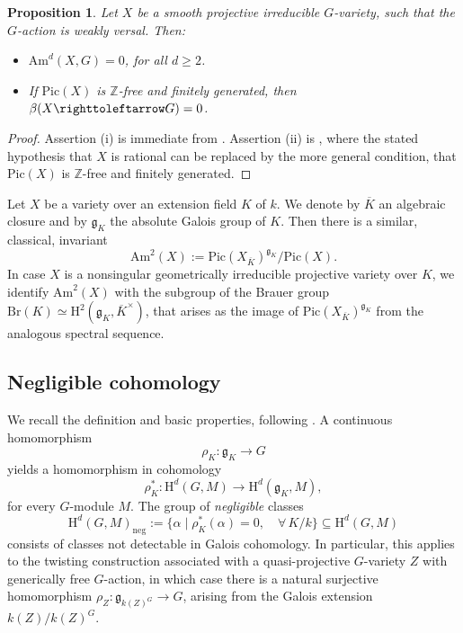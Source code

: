 \documentclass[12pt, reqno]{amsart}
\numberwithin{equation}{section}
\theoremstyle{plain}
\newtheorem{prop}{Proposition}[section]
\theoremstyle{definition}
\newcommand{\actsfromright}{\righttoleftarrow}
\def\bZ{{\mathbb Z}}
\def\rH{{\mathrm H}}
\def\Br{\mathrm{Br}}
\def\Pic{\mathrm{Pic}}
\def\Am{\mathrm{Am}}
\begin{document}
\begin{prop}
\label{prop.Am2obstructsWV}
Let $X$ be a smooth projective irreducible $G$-variety, such that the
$G$-action is weakly versal.
Then:
\begin{itemize}
\item[(i)] $\Am^d(X,G)=0$, for all $d\ge 2$.
\item[(ii)] If $\Pic(X)$ is $\bZ$-free and finitely generated, then $\beta(X\actsfromright G)=0$.
\end{itemize}
\end{prop}

\begin{proof}
Assertion (i) is immediate from \cite[Thm.\ 5.1]{STZ}.
Assertion (ii) is \cite[Thm.\ 5.3]{KT-uni}, where the stated hypothesis that $X$ is rational can be replaced by the more general condition, that $\Pic(X)$ is $\bZ$-free and finitely generated.
\end{proof}

Let $X$ be a variety over an
extension field $K$ of $k$. 
We denote by $\overline{K}$ an algebraic closure and by $\mathfrak g_K$ the absolute Galois group of $K$.
Then there is a similar, classical,  invariant
$$
\Am^2(X):=\Pic(X_{\overline{K}})^{\mathfrak g_K}/\Pic(X).
$$
In case $X$ is a nonsingular geometrically irreducible projective variety over $K$, we identify $\Am^2(X)$ with the subgroup of the Brauer group $\Br(K)\simeq \rH^2(\mathfrak g_K,\overline{K}^\times)$, that arises as the image of $\Pic(X_{\overline{K}})^{\mathfrak g_K}$ from the analogous spectral sequence.



\subsection*{Negligible cohomology}

We recall the definition and basic properties, following \cite{GM}. A continuous homomorphism 
$$
\rho_K\colon \mathfrak g_K \to G
$$
yields a homomorphism in cohomology
$$
\rho_K^*\colon \rH^d(G,M)\to \rH^d(\mathfrak g_K,M), 
$$
for every $G$-module $M$. The group of {\em negligible} classes
$$
\rH^d(G,M)_{\mathrm{neg}}:=
\{ \alpha \mid \rho_K^*(\alpha)=0, \quad \forall\, K/k\} \subseteq \rH^d(G,M)
$$
consists of classes not detectable in Galois cohomology. In particular, this applies to the twisting construction associated with a quasi-projective $G$-variety $Z$ with generically free $G$-action, in which case there is a natural surjective homomorphism $\rho_Z\colon \mathfrak g_{k(Z)^G}\to G$, arising from the Galois extension $k(Z)/k(Z)^G$. 
\end{document}
